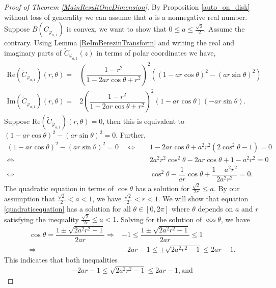 \documentclass[10pt,a4paper]{amsart}
\begin{document}
\begin{proof}[Proof of Theorem \ref{MainResultOneDimension}]
By Proposition \ref{auto_on_disk} without loss of generality we can assume that $a$ is a nonnegative real number.
Suppose $B(C_{\varphi_{a,1}})$ is convex, we want to show that $0\leq a \leq \frac{\sqrt{2}}{2}$.
Assume the contrary. Using Lemma \ref{ReImBerezinTransform} and writing the real and imaginary parts of $\widetilde{C}_{\varphi_{a,1}}(z)$ in terms of polar coordinates we have,
\begin{align} 
\mathrm{Re}(\widetilde{C}_{\varphi_{a,1}})(r,\theta)=&\left(\dfrac{1-r^2}{1-2ar\cos\theta+r^2} \right)^2\left(\left(1-ar\cos\theta \right)^2-\left(ar\sin\theta\right)^2 \right) \label{polarform}  \\
\mathrm{Im}(\widetilde{C}_{\varphi_{a,1}})(r,\theta)=&2\left(\dfrac{1-r^2}{1-2ar\cos\theta+r^2} \right)^2\left(1-ar\cos\theta \right)\left(-ar\sin\theta\right). \nonumber
\end{align}
Suppose $\mathrm{Re}(\widetilde{C}_{\varphi_{a,1}})(r,\theta)=0$, then this is equivalent to $\left(1-ar\cos\theta \right)^2-\left(ar\sin\theta\right)^2 =0$. Further, 
\begin{align}
 \left(1-ar\cos\theta \right)^2-\left(ar\sin\theta\right)^2=0 \quad 
 \Leftrightarrow& \quad 1-2ar\cos\theta+a^2r^2(2\cos^2\theta-1)=0 \nonumber \\
 \Leftrightarrow& \quad 2a^2r^2\cos^2\theta-2ar\cos\theta+1-a^2r^2=0 \nonumber \\
 \Leftrightarrow& \quad \cos^2\theta-\dfrac{1}{ar}\cos\theta+\dfrac{1-a^2r^2}{2a^2r^2}=0. \label{quadraticequation}
\end{align}
The quadratic equation in terms of $\cos \theta$ has a solution for $ \frac{\sqrt{2}}{2r}\leq a.$ By our assumption that $\frac{\sqrt{2}}{2}<a<1$, we have $\frac{\sqrt{2}}{2}<r<1$. We will show that equation \eqref{quadraticequation} has a solution for all $\theta \in [0,2\pi]$ where $\theta$ depends on $a$ and $r$ satisfying the inequality $\frac{\sqrt{2}}{2r} \leq a < 1.$ Solving for the solution of $\cos \theta$, we have 
\begin{align*}
\cos \theta = \dfrac{1 \pm \sqrt{2a^2r^2-1}}{2ar} \Rightarrow& -1 \leq \dfrac{1 \pm \sqrt{2a^2r^2-1}}{2ar} \leq 1 \\
\Rightarrow& -2ar-1 \leq \pm \sqrt{2a^2r^2-1} \leq 2ar-1.
\end{align*}
This indicates that both inequalities  
\begin{align}\label{inequality1}
-2ar-1 \leq \sqrt{2a^2r^2-1} \leq 2ar-1, \text{and}    

\end{align}
\end{proof}
\end{document}

